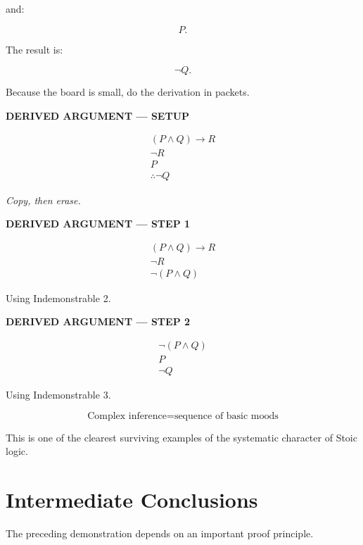 \documentclass[11pt]{article}
\begin{document}
and:

\[
P.
\]

The result is:

\[
\neg Q.
\]

Because the board is small, do the derivation in packets.

\begin{whiteboard}
\textbf{DERIVED ARGUMENT --- SETUP}

\[
\begin{array}{c}
(P\land Q)\rightarrow R\\
\neg R\\
P\\
\hline
\therefore \neg Q
\end{array}
\]

\textit{Copy, then erase.}
\end{whiteboard}

\begin{whiteboard}
\textbf{DERIVED ARGUMENT --- STEP 1}

\[
\begin{array}{c}
(P\land Q)\rightarrow R\\
\neg R\\
\hline
\neg(P\land Q)
\end{array}
\]

Using Indemonstrable 2.
\end{whiteboard}

\begin{whiteboard}
\textbf{DERIVED ARGUMENT --- STEP 2}

\[
\begin{array}{c}
\neg(P\land Q)\\
P\\
\hline
\neg Q
\end{array}
\]

Using Indemonstrable 3.

\[
\boxed{
\text{Complex inference}
=
\text{sequence of basic moods}
}
\]
\end{whiteboard}

This is one of the clearest surviving examples of the systematic
character of Stoic logic.

\section{Intermediate Conclusions}

The preceding demonstration depends on an important proof
principle.
\end{document}
